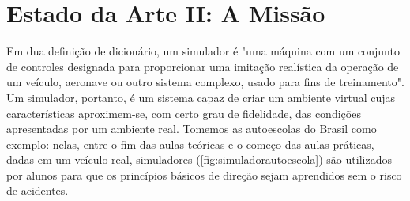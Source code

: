 \documentclass[cic,tc]{iiufrgs}
\begin{document}
%
%
%
%
%
%

\chapter{Estado da Arte II: A Missão}

Em dua definição de dicionário, um simulador é "uma máquina com um conjunto de
controles designada para proporcionar uma imitação realística da operação de um
veículo, aeronave ou outro sistema complexo, usado para fins de treinamento". Um
simulador, portanto, é um sistema capaz de criar um ambiente virtual cujas
características aproximem-se, com certo grau de fidelidade, das condições
apresentadas por um ambiente real. Tomemos as autoescolas do Brasil como
exemplo: nelas, entre o fim das aulas teóricas e o começo das aulas práticas,
dadas em um veículo real, simuladores (\ref{fig:simuladorautoescola}) são
utilizados por alunos para que os princípios básicos de direção sejam aprendidos
sem o risco de acidentes.
\end{document}
